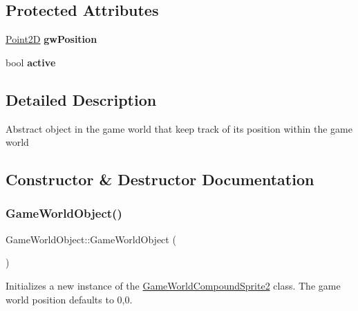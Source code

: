 \subsection*{Protected Attributes}
\begin{DoxyCompactItemize}
\item 
\mbox{\label{class_game_world_object_a87f4cffe1c02cef24305adade2a89dd2}} 
\hyperlink{struct_point2_d}{Point2D} {\bfseries gw\+Position}
\item 
\mbox{\label{class_game_world_object_a51ccb433f7e6ed99e280840bb611596d}} 
bool {\bfseries active}
\end{DoxyCompactItemize}


\subsection{Detailed Description}
Abstract object in the game world that keep track of its position within the game world 



\subsection{Constructor \& Destructor Documentation}
\mbox{\label{class_game_world_object_a1c273875f7dd21cb8ec9f03b6ff26a18}} 
\subsubsection{\texorpdfstring{Game\+World\+Object()}{GameWorldObject()}}
{\footnotesize\ttfamily Game\+World\+Object\+::\+Game\+World\+Object (\begin{DoxyParamCaption}{ }\end{DoxyParamCaption})}



Initializes a new instance of the \hyperlink{class_game_world_compound_sprite2}{Game\+World\+Compound\+Sprite2} class. The game world position defaults to 0,0. 

\mbox{\label{class_game_world_object_aa0a604119a1f66b3a299e8a192c4b554}} 
